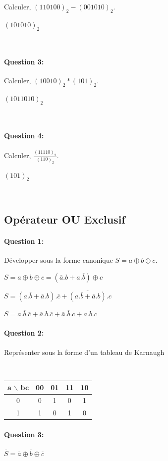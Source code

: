 Calculer, $(110100)_{2}-(001010)_{2}$.

$(101010)_{2}$

~\

\paragraph{Question 3:}

Calculer, $(10010)_{2}*(101)_{2}$.

$(1011010)_{2}$

~\

\paragraph{Question 4:}

Calculer, $\frac{(11110)_{2}}{(110)_{2}}$.

$(101)_{2}$

~\

\subsection{Opérateur OU Exclusif}

\paragraph{Question 1:}

Développer sous la forme canonique $S= a \oplus b \oplus c$.

$S= a \oplus b \oplus c=(\overline{a}.b+a.\overline{b}) \oplus c$

$S=(a.\overline{b}+\overline{a}.b).\overline{c}+\overline{(a.\overline{b}+\overline{a}.b)}.c$

$S=a.\overline{b}.\overline{c}+\overline{a}.b.\overline{c}+\overline{a}.\overline{b}.c+a.b.c$



\paragraph{Question 2:}

Représenter sous la forme d'un tableau de Karnaugh

~\

\begin{center}
\begin{tabular}{|c|c|c|c|c|}
\hline
a $\backslash$ bc & 00 & 01 & 11 & 10 \\
\hline
0  & 0 & 1 & 0 & 1 \\
\hline
1  & 1 & 0 & 1 & 0 \\
\hline
\end{tabular} 
\end{center}

\paragraph{Question 3:}

$\overline{S}= \overline{a} \oplus \overline{b} \oplus \overline{c}$


